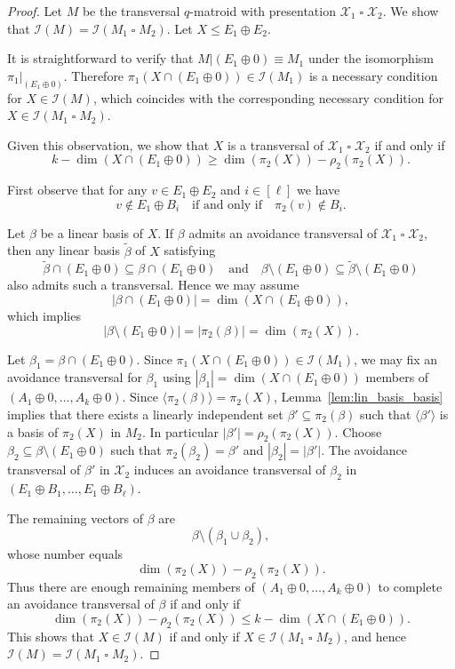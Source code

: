 \documentclass[10pt,a4paper]{amsart}
\newcommand{\sq}{\mathbin{\square}}
\begin{document}
\begin{proof}
Let $M$ be the transversal $q$-matroid with presentation $\mathcal{X}_1\sq\mathcal{X}_2$. We show that $\mathcal{I}(M)=\mathcal{I}(M_1\sq M_2)$. Let $X\le E_1\oplus E_2$.

It is straightforward to verify that $M|(E_1\oplus0)\equiv M_1$ under the isomorphism $\pi_1|_{(E_1\oplus0)}$. Therefore $\pi_1(X\cap(E_1\oplus0))\in\mathcal{I}(M_1)$ is a necessary condition for $X\in\mathcal{I}(M)$, which coincides with the corresponding necessary condition for $X\in\mathcal{I}(M_1\sq M_2)$.

Given this observation, we show that $X$ is a transversal of $\mathcal{X}_1\sq\mathcal{X}_2$ if and only if
\[
k-\dim(X\cap(E_1\oplus0))
\ge
\dim(\pi_2(X))-\rho_2(\pi_2(X)).
\]

First observe that for any $v\in E_1\oplus E_2$ and $i\in[\ell]$ we have
\[
v\notin E_1\oplus B_i
\quad\text{if and only if}\quad
\pi_2(v)\notin B_i.
\]

Let $\beta$ be a linear basis of $X$. If $\beta$ admits an avoidance transversal of $\mathcal{X}_1\sq\mathcal{X}_2$, then any linear basis $\tilde{\beta}$ of $X$ satisfying
\[
\tilde{\beta}\cap(E_1\oplus0)\subseteq\beta\cap(E_1\oplus0)
\quad\text{and}\quad
\beta\setminus(E_1\oplus0)\subseteq\tilde{\beta}\setminus(E_1\oplus0)
\]
also admits such a transversal. Hence we may assume
\[
|\beta\cap(E_1\oplus0)|=\dim(X\cap(E_1\oplus0)),
\]
which implies
\[
|\beta\setminus(E_1\oplus0)|=|\pi_2(\beta)|=\dim(\pi_2(X)).
\]

Let $\beta_1=\beta\cap(E_1\oplus0)$. Since $\pi_1(X\cap(E_1\oplus0))\in\mathcal{I}(M_1)$, we may fix an avoidance transversal for $\beta_1$ using $|\beta_1|=\dim(X\cap(E_1\oplus0))$ members of $(A_1\oplus0,\dots,A_k\oplus0)$.
Since $\langle\pi_2(\beta)\rangle=\pi_2(X)$, Lemma~\ref{lem:lin_basis_basis} implies that there exists a linearly independent set $\beta'\subseteq\pi_2(\beta)$ such that $\langle\beta'\rangle$ is a basis of $\pi_2(X)$ in $M_2$. In particular $|\beta'|=\rho_2(\pi_2(X))$.
Choose $\beta_2\subseteq\beta\setminus(E_1\oplus0)$ such that $\pi_2(\beta_2)=\beta'$ and $|\beta_2|=|\beta'|$. The avoidance transversal of $\beta'$ in $\mathcal{X}_2$ induces an avoidance transversal of $\beta_2$ in $(E_1\oplus B_1,\dots,E_1\oplus B_\ell)$.

The remaining vectors of $\beta$ are
\[
\beta\setminus(\beta_1\cup\beta_2),
\]
whose number equals
\[
\dim(\pi_2(X))-\rho_2(\pi_2(X)).
\]
Thus there are enough remaining members of $(A_1\oplus0,\dots,A_k\oplus0)$ to complete an avoidance transversal of $\beta$ if and only if
\[
\dim(\pi_2(X))-\rho_2(\pi_2(X))
\le
k-\dim(X\cap(E_1\oplus0)).
\]
This shows that $X\in\mathcal{I}(M)$ if and only if $X\in\mathcal{I}(M_1\sq M_2)$, and hence $\mathcal{I}(M)=\mathcal{I}(M_1\sq M_2)$.
\end{proof}
\end{document}
